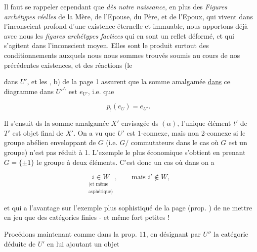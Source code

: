 Il faut se rappeler cependant que \textit{dès notre naissance}, en plus des \textit{Figures archétypes réelles} de la Mère, de l'Epouse, du Père, et de l'Epoux, qui vivent dans l'inconscient profond d'une existence éternelle et immuable, nous apportons déjà avec nous les \textit{figures archétypes factices} qui en sont un reflet déformé, et qui s'agitent dans l'inconscient moyen. Elles sont le produit surtout des conditionnements auxquels nous nous sommes trouvés soumis au cours de nos précédentes existences, et des réactions (le



dans $U'$, et les  , b) de la page 1 assurent que la somme amalgamée \uline{dans}  ce diagramme dans $U'^\wedge$ est $e_{U'}$, i.e. que

\[
 p_!(e_U)=e_{U'}.
\]

Il s'ensuit  ds la somme amalgamée $X'$ envisagée ds $(\alpha)$, l'unique élément $t'$ de $T'$ est objet final de $X'$. On a vu que $U'$  est 1-connexe, mais non 2-connexe si le groupe abélien enveloppant de $G$ (i.e. $G/$ commutateurs dans le cas où $G$ est un groupe) n'est pas réduit à 1. L'exemple le plus économique s'obtient en prenant $G=\{\pm1\}$ le groupe à deux éléments. C'est donc un cas où dans  on a

\[
 \underset{\substack{\text{(et même}\\\text{asphérique)}}}{i\in W},\qquad \text{mais }i'\notin W,
\]

et qui a l'avantage sur l'exemple plus sophistiqué de la page  (prop. ) de ne mettre en jeu que des catégories finies - et même fort petites !

Procédons maintenant comme dans la prop. 11, en désignant par $U''$ la catégorie déduite de $U'$ en lui ajoutant un objet


